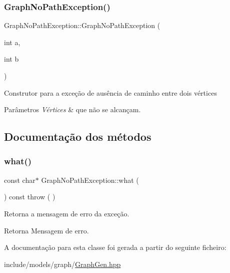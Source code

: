 \subsubsection{\texorpdfstring{GraphNoPathException()}{GraphNoPathException()}}
{\footnotesize\ttfamily Graph\+No\+Path\+Exception\+::\+Graph\+No\+Path\+Exception (\begin{DoxyParamCaption}\item[{int}]{a,  }\item[{int}]{b }\end{DoxyParamCaption})\hspace{0.3cm}{\ttfamily [inline]}}

Construtor para a exceção de ausência de caminho entre dois vértices 
\begin{DoxyParams}{Parâmetros}
{\em Vértices} & que não se alcançam. \\
\hline
\end{DoxyParams}


\subsection{Documentação dos métodos}
\mbox{\label{classGraphNoPathException_a33d7ba709a76ad03175a929e8313221c}} 
\subsubsection{\texorpdfstring{what()}{what()}}
{\footnotesize\ttfamily const char$\ast$ Graph\+No\+Path\+Exception\+::what (\begin{DoxyParamCaption}{ }\end{DoxyParamCaption}) const throw ( ) \hspace{0.3cm}{\ttfamily [inline]}}

Retorna a mensagem de erro da exceção. \begin{DoxyReturn}{Retorna}
Mensagem de erro. 
\end{DoxyReturn}


A documentação para esta classe foi gerada a partir do seguinte ficheiro\+:\begin{DoxyCompactItemize}
\item 
include/models/graph/\mbox{\hyperlink{GraphGen_8hpp}{Graph\+Gen.\+hpp}}\end{DoxyCompactItemize}
